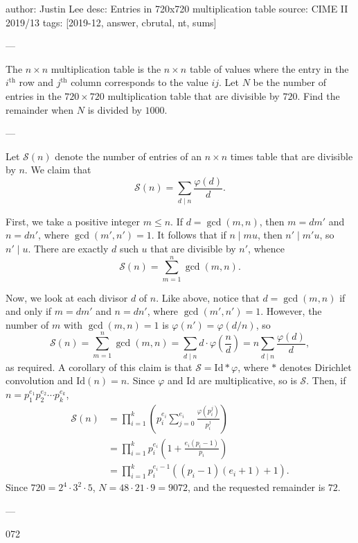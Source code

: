 author: Justin Lee
desc: Entries in 720x720 multiplication table
source: CIME II 2019/13
tags: [2019-12, answer, cbrutal, nt, sums]

---

The $n \times n$ multiplication table is the $n \times n$ table of values where the entry in the $i^{\text{th}}$ row and $j^{\text{th}}$ column corresponds to the value $ij.$ Let $N$ be the number of entries in the $720 \times 720$ multiplication table that are divisible by $720.$ Find the remainder when $N$ is divided by $1000.$

---

Let $\mathcal S(n)$ denote the number of entries of an $n\times n$ times table that are divisible by $n$. We claim that \[\mathcal S(n)=\sum_{d\mid n}\frac{\varphi(d)}d.\]

First, we take a positive integer $m\le n$. If $d=\gcd(m,n)$, then $m=dm'$ and $n=dn'$, where $\gcd(m',n')=1$. It follows that if $n\mid mu$, then $n'\mid m'u$, so $n'\mid u$. There are exactly $d$ such $u$ that are divisible by $n'$, whence \[\mathcal S(n)=\sum_{m=1}^n \gcd(m,n).\]

Now, we look at each divisor $d$ of $n$. Like above, notice that $d=\gcd(m,n)$ if and only if $m=dm'$ and $n=dn'$, where $\gcd(m',n')=1$. However, the number of $m$ with $\gcd(m,n)=1$ is $\varphi(n')=\varphi(d/n)$, so \[\mathcal S(n)=\sum_{m=1}^n\gcd(m,n)=\sum_{d\mid n}d\cdot\varphi\left(\frac{n}{d}\right)=n\sum_{d\mid n}\frac{\varphi(d)}{d},\]
as required. A corollary of this claim is that $\mathcal S=\text{Id}*\varphi$, where $*$ denotes Dirichlet convolution and $\text{Id}(n)=n$. Since $\varphi$ and $\text{Id}$ are multiplicative, so is $\mathcal S$. Then, if $n=p_1^{e_1}p_2^{e_2}\cdots p_k^{e_k}$,
\begin{align*}
    \mathcal S(n)&=\prod_{i=1}^k\left(p_i^{e_i}\sum_{j=0}^{e_i}\frac{\varphi(p_i^j)}{p_i^j}\right)\\
    &=\prod_{i=1}^k p_i^{e_i}\left(1+\frac{e_i(p_i-1)}{p_i}\right)\\
    &=\prod_{i=1}^k p_i^{e_i-1}((p_i-1)(e_i+1)+1).
\end{align*}
Since $720=2^4\cdot 3^2\cdot 5$, $N=48\cdot 21\cdot 9=9072$, and the requested remainder is $72$.

---

072
